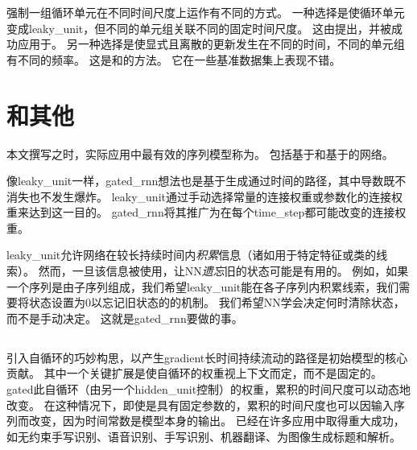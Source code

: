 
强制一组循环单元在不同时间尺度上运作有不同的方式。
一种选择是使循环单元变成\gls{leaky_unit}，但不同的单元组关联不同的固定时间尺度。
这由\cite{Mozer-nips92}提出，并被成功应用于\cite{Pascanu+al-ICML2013-small}。
另一种选择是使显式且离散的更新发生在不同的时间，不同的单元组有不同的频率。
这是\cite{ElHihi+Bengio-nips8}和\cite{Koutnik-et-al-ICML2014}的方法。
它在一些基准数据集上表现不错。

\section{和其他}
\label{sec:the_long_short_term_memory_and_other_gated_rnns}
本文撰写之时，实际应用中最有效的序列模型称为。
包括基于和基于的网络。

像\gls{leaky_unit}一样，\gls{gated_rnn}想法也是基于生成通过时间的路径，其中导数既不消失也不发生爆炸。
\gls{leaky_unit}通过手动选择常量的连接权重或参数化的连接权重来达到这一目的。
\gls{gated_rnn}将其推广为在每个\gls{time_step}都可能改变的连接权重。

\gls{leaky_unit}允许网络在较长持续时间内\emph{积累}信息（诸如用于特定特征或类的线索）。
然而，一旦该信息被使用，让\gls{NN}\emph{遗忘}旧的状态可能是有用的。
例如，如果一个序列是由子序列组成，我们希望\gls{leaky_unit}能在各子序列内积累线索，我们需要将状态设置为0以忘记旧状态的的机制。
我们希望\gls{NN}学会决定何时清除状态，而不是手动决定。
这就是\gls{gated_rnn}要做的事。

\subsection{}
\label{sec:lstm}
引入自循环的巧妙构思，以产生\gls{gradient}长时间持续流动的路径是初始模型的核心贡献\citep{Hochreiter+Schmidhuber-1997}。
其中一个关键扩展是使自循环的权重视上下文而定，而不是固定的\citep{Gers-et-al-2000}。
\gls{gated}此自循环（由另一个\gls{hidden_unit}控制）的权重，累积的时间尺度可以动态地改变。
在这种情况下，即使是具有固定参数的，累积的时间尺度也可以因输入序列而改变，因为时间常数是模型本身的输出。
已经在许多应用中取得重大成功，如无约束手写识别\citep{Graves+Schmidhuber-2009}、语音识别\citep{Graves-et-al-ICASSP2013,Graves+Jaitly-ICML2014}、手写识别\citep{Graves-et-al-ICASSP2013}、机器翻译\citep{Sutskever-et-al-NIPS2014}、为图像生成标题\citep{Kiros-et-al-arxiv2014,Vinyals-et-al-arxiv2014,Xu-et-al-ICML2015}和解析\citep{Vinyals2014}。

